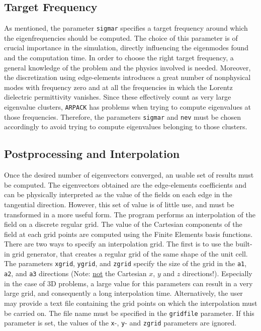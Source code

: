 \documentclass[11pt,a4paper,oneside]{article}
\begin{document}
\subsection{Target Frequency}
As mentioned, the parameter {\tt sigmar} specifies a target frequency around which the eigenfrequencies should be computed. The choice of this parameter is of crucial importance in the simulation, directly influencing the eigenmodes found and the computation time. In order to choose the right target frequency, a general knowledge of the problem and the physics involved is needed.
Moreover, the discretization using edge-elements introduces a great number of nonphysical modes with frequency zero and at all the frequencies in which the Lorentz dielectric permittivity vanishes. Since these effectively count as very large eigenvalue clusters, {\tt ARPACK} has problems when trying to compute eigenvalues at those frequencies. Therefore, the parameters {\tt sigmar} and {\tt nev} must be chosen accordingly to avoid trying to compute eigenvalues belonging to those clusters.

\subsection{Postprocessing and Interpolation}
Once the desired number of eigenvectors converged, an usable set of results must be computed. The eigenvectors obtained are the edge-elements coefficients and can be physically interpreted as the value of the fields on each edge in the tangential direction. However, this set of value is of little use, and must be transformed in a more useful form. The program performs an interpolation of the field on a discrete regular grid. The value of the Cartesian components of the field at each grid points are computed using the Finite Elements basis functions. There are two ways to specify an interpolation grid. The first is to use the built-in grid generator, that creates a regular grid of the same shape of the unit cell. The parameters {\tt xgrid}, {\tt ygrid}, and {\tt zgrid} specify the size of the grid in the {\tt a1}, {\tt a2}, and {\tt a3} directions (Note: \underline{not} the Cartesian $x$, $y$ and $z$ directions!). Especially in the case of 3D problems, a large value for this parameters can result in a very large grid, and consequently a long interpolation time. Alternatively, the user may provide a text file containing the grid points on which the interpolation must be carried on. The file name must be specified in the {\tt gridfile} parameter. If this parameter is set, the values of the {\tt x}-, {\tt y}- and {\tt zgrid} parameters are ignored.
\end{document}
